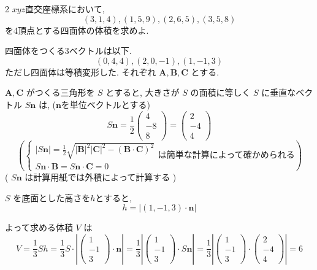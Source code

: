 \documentclass[uplatex,b5paper]{jsarticle}
\begin{document}
\begin{prob}2
  \(xyz\)直交座標系において,
  \[(3,1,4), (1,5,9), (2,6,5), (3,5,8)\]
  を4頂点とする四面体の体積を求めよ.

  \vspace{2cm}
  四面体をつくる3ベクトルは以下.
  \[(0,4,4), (2,0,-1), (1,-1,3)\]
  ただし四面体は等積変形した.
  それぞれ \(\bm A,\bm B,\bm C\) とする.

  \(\bm A,\bm C\) がつくる三角形を \(S\) とすると,
  大きさが \(S\) の面積に等しく
  \(S\) に垂直なベクトル \(S\bm n\) は,
  (\(\bm n\)を単位ベクトルとする)
  \[S\bm n=\frac12
    \left(
      \begin{array}{ccc}
        4\\-8\\8
      \end{array}
    \right)
    =
    \left(
      \begin{array}{ccc}
        2\\-4\\4
      \end{array}
    \right)
  \]
  \[
    \left(
      \begin{cases}
        |S\bm n|=\frac12\sqrt{|\bm B|^2|\bm C|^2-(\bm B\cdot\bm C)^2}\\
        S\bm n\cdot\bm B=S\bm n\cdot\bm C=0
      \end{cases}
      \text{は簡単な計算によって確かめられる}
    \right)
  \]
  ( \(S\bm n\) は計算用紙では外積によって計算する )

  \(S\) を底面とした高さを\(h\)とすると,
  \[h=|(1,-1,3)\cdot \bm n|\]

  よって求める体積 \(V\) は
  \[V=\frac13Sh
    = \frac13S\cdot\left|
    \left(
      \begin{array}{ccc}
        1\\-1\\3
      \end{array}
    \right)
      \cdot\bm n\right|
    = \frac13\left|
    \left(
      \begin{array}{ccc}
        1\\-1\\3
      \end{array}
    \right)
      \cdot S\bm n\right|
    = \frac13\left|
    \left(
      \begin{array}{ccc}
        1\\-1\\3
      \end{array}
    \right)
    \cdot
    \left(
      \begin{array}{ccc}
        2\\-4\\4
      \end{array}
    \right)\right|
    =6
  \]
\end{prob}
\newpage
\end{document}
